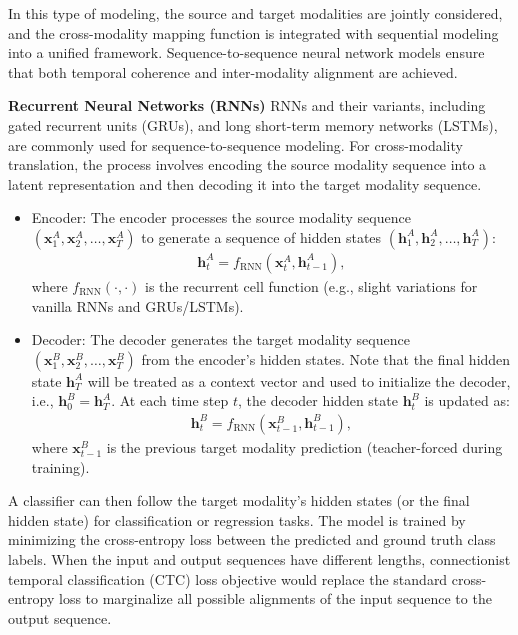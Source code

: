 \documentclass[journal]{IEEEtran}
\begin{document}
In this type of modeling, the source and target modalities are jointly considered, and the cross-modality mapping function is integrated with sequential modeling into a unified framework. Sequence-to-sequence neural network models \cite{Sutskever2014} ensure that both temporal coherence and inter-modality alignment are achieved.

\textbf{Recurrent Neural Networks (RNNs)} RNNs and their variants, including gated recurrent units (GRUs), and long short-term memory networks (LSTMs), are commonly used for sequence-to-sequence modeling. For cross-modality translation, the process involves encoding the source modality sequence into a latent representation and then decoding it into the target modality sequence.
\begin{itemize}
\item Encoder: The encoder processes the source modality sequence $(\mathbf{x}_{1}^{A}, \mathbf{x}_{2}^{A}, \ldots, \mathbf{x}_{T}^{A})$ to generate a sequence of hidden states $(\mathbf{h}_{1}^{A}, \mathbf{h}_{2}^{A}, \ldots, \mathbf{h}_{T}^{A})$:
\begin{align}
\mathbf{h}_t^{A} = f_{\text{RNN}}(\mathbf{x}_t^{A}, \mathbf{h}_{t-1}^{A}),
\end{align}
where $f_{\text{RNN}}(\cdot, \cdot)$ is the recurrent cell function (e.g., slight variations for vanilla RNNs and GRUs/LSTMs).
\item Decoder: The decoder generates the target modality sequence $(\mathbf{x}_{1}^{B}, \mathbf{x}_{2}^{B}, \ldots, \mathbf{x}_{T}^{B})$ from the encoder's hidden states. Note that the final hidden state $\mathbf{h}_{T}^{A}$ will be treated as a context vector and used to initialize the decoder, i.e., $\mathbf{h}_{0}^{B} = \mathbf{h}_{T}^{A}$. At each time step $t$, the decoder hidden state $\mathbf{h}_t^{B}$ is updated as:
\begin{align}
\mathbf{h}_t^{B} = f_{\text{RNN}}(\mathbf{x}_{t-1}^{B}, \mathbf{h}_{t-1}^{B}),
\end{align}
where $\mathbf{x}_{t-1}^{B}$ is the previous target modality prediction (teacher-forced during training).
\end{itemize}

A classifier can then follow the target modality's hidden states (or the final hidden state) for classification or regression tasks. The model is trained by minimizing the cross-entropy loss between the predicted and ground truth class labels. When the input and output sequences have different lengths, connectionist temporal classification (CTC) loss objective \cite{Graves2006} would replace the standard cross-entropy loss to marginalize all possible alignments of the input sequence to the output sequence.
\end{document}
